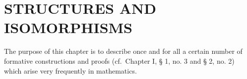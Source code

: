 \section{STRUCTURES AND ISOMORPHISMS}

The purpose of this chapter is to describe once and for all a certain number of formative constructions and proofs (cf.~Chapter I, § 1, no. 3 and § 2, no. 2) which arise very frequently in mathematics.

